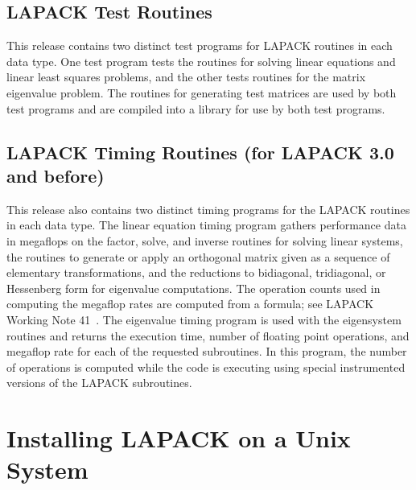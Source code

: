 \documentclass[11pt]{report}
\begin{document}
\subsection{LAPACK Test Routines}

This release contains two distinct test programs for LAPACK routines
in each data type.  One test program tests the routines for solving
linear equations and linear least squares problems,
and the other tests routines for the matrix eigenvalue problem.
The routines for generating test matrices are used by both test
programs and are compiled into a library for use by both test programs.

\subsection{LAPACK Timing Routines (for LAPACK 3.0 and before) }

This release also contains two distinct timing programs for the
LAPACK routines in each data type.
The linear equation timing program gathers performance data in
megaflops on the factor, solve, and inverse routines for solving
linear systems, the routines to generate or apply an orthogonal matrix
given as a sequence of elementary transformations, and the reductions
to bidiagonal, tridiagonal, or Hessenberg form for eigenvalue
computations.
The operation counts used in computing the megaflop rates are computed
from a formula;
see LAPACK Working Note 41~\cite{WN41}.
The eigenvalue timing program is used with the eigensystem routines
and returns the execution time, number of floating point operations, and
megaflop rate for each of the requested subroutines.
In this program, the number of operations is computed while the
code is executing using special instrumented versions of the LAPACK
subroutines.

\section{Installing LAPACK on a Unix System}\label{installation}
\end{document}
